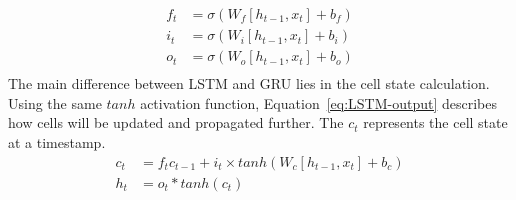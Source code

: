 \begin{equation}
    \begin{split}
        f_t &= \sigma \left(W_f \left[h_{t-1}, x_t \right] + b_f \right) \\
        i_t &= \sigma \left(W_i \left[h_{t-1}, x_t \right] + b_i \right) \\
        o_t &= \sigma \left(W_o \left[h_{t-1}, x_t \right] + b_o \right) \\    
    \end{split}
    \label{eq:LSTM-gates}
\end{equation}
The main difference between LSTM and GRU lies in the cell state calculation.
Using the same $tanh$ activation function, \mbox{Equation~\ref{eq:LSTM-output}} describes how cells will be updated and propagated further.
The $c_t$ represents the cell state at a timestamp.
\begin{equation}
    \begin{split}
        c_t &= f_t c_{t-1}+i_t \times tanh \left(W_c \left[h_{t-1}, x_t \right] + b_c \right) \\
        h_t &= o_t*tanh \left(c_t \right)
    \end{split}
    \label{eq:LSTM-output}
\end{equation}


%
